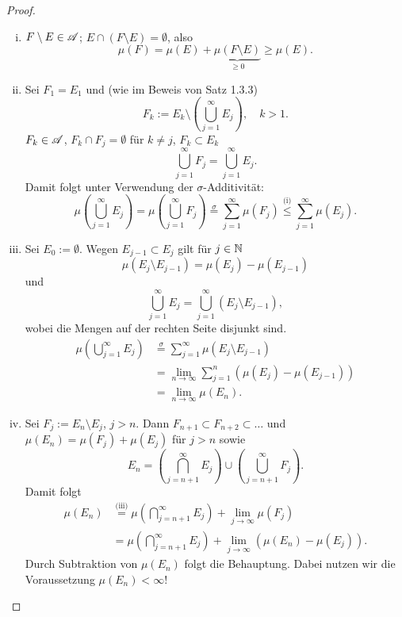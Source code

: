 \documentclass[
 a4paper,
 12pt,
 parskip=half
 ]{scrreprt}
\theoremstyle{plain}
\theoremstyle{definition}
\numberwithin{equation}{section}
\begin{document}
\begin{proof}
 \begin{enumerate}[(i)]
  \item $F \setminus E \in \mathscr{A}$; $E \cap (F \setminus E) = \emptyset$, also
   \[ \mu(F) = \mu(E) + \underbrace{\mu(F \setminus E)}_{\ge 0} \ge \mu(E). \]
  \item Sei $F_1 = E_1$ und (wie im Beweis von Satz 1.3.3)
   \[ F_k := E_k \setminus \left( \bigcup_{j=1}^\infty E_j \right), \quad k > 1. \]
   $F_k \in \mathscr{A}$, $F_k \cap F_j = \emptyset$ für $k \ne j$, $F_k \subset E_k$
   \[ \bigcup_{j=1}^\infty F_j = \bigcup_{j=1}^\infty E_j. \]
   Damit folgt unter Verwendung der $\sigma$-Additivität:
   \[ \mu \left( \bigcup_{j=1}^\infty E_j \right) = \mu \left( \bigcup_{j=1}^\infty F_j \right) \overset{\sigma}{=} \sum_{j=1}^\infty \mu( F_j ) \overset{\text{(i)}}{\le} \sum_{j=1}^\infty \mu( E_j ). \]
  \item Sei $E_0 := \emptyset$. Wegen $E_{j-1} \subset E_j$ gilt für $j \in \mathbb{N}$
   \[ \mu( E_j \setminus E_{j-1} ) = \mu(E_j) - \mu(E_{j-1}) \]
   und
   \[ \bigcup_{j=1}^\infty E_j = \bigcup_{j=1}^\infty(E_j \setminus E_{j-1}), \]
   wobei die Mengen auf der rechten Seite disjunkt sind.
   \begin{align*}
    \mu \left( \bigcup_{j=1}^\infty E_j \right) 
      &\overset{\sigma}{=} \sum_{j=1}^\infty \mu( E_j \setminus E_{j-1}) \\
      &= \lim_{n \to \infty} \sum_{j=1}^n ( \mu( E_j ) - \mu( E_{j-1} ) ) \\
      &= \lim_{n \to \infty} \mu( E_n ).
   \end{align*}
  \item Sei $F_j := E_n \setminus E_j$, $j > n$. Dann $F_{n+1} \subset F_{n+2} \subset \ldots$ und $\mu( E_n )  = \mu( F_j ) + \mu( E_j )$ für $j > n$ sowie
  \[ E_n = \left( \bigcap_{j=n+1}^\infty E_j \right) \cup \left( \bigcup_{j=n+1}^\infty F_j \right). \]
  Damit folgt
  \begin{align*}
   \mu(E_n) 
    &\overset{\text{(iii)}}{=} \mu \left( \bigcap_{j=n+1}^\infty E_j \right) + \lim_{j \to \infty} \mu (F_j) \\
    & = \mu \left( \bigcap_{j=n+1}^\infty E_j \right) + \lim_{j \to \infty} ( \mu( E_n ) - \mu(E_j) ).
  \end{align*}
  Durch Subtraktion von $\mu(E_n)$ folgt die Behauptung. Dabei nutzen wir die Voraussetzung $\mu(E_n) < \infty$! \qedhere
 \end{enumerate}
\end{proof}
\end{document}
